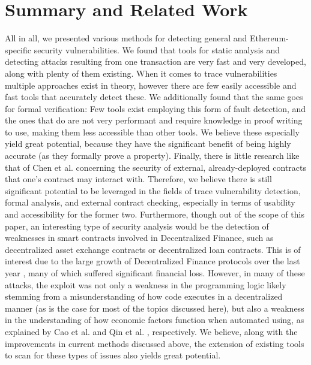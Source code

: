 \documentclass[letterpaper,twocolumn,10pt]{article}
\begin{document}
\section{Summary and Related Work}
All in all, we presented various methods for detecting general and Ethereum-specific security vulnerabilities.  We found that tools for static analysis and detecting attacks resulting from one transaction are very fast and very developed, along with plenty of them existing. When it comes to trace vulnerabilities multiple approaches exist in theory, however there are few easily accessible and fast tools that accurately detect these. We additionally found that the same goes for formal verification: Few tools exist employing this form of fault detection, and the ones that do are not very performant and require knowledge in proof writing to use, making them less accessible than other tools. We believe these especially yield great potential, because they have the significant benefit of being highly accurate (as they formally prove a property). Finally, there is little research like that of Chen et al. \cite{chen_zhu_li_chen_li_luo_lin_zhange_2018} concerning the security of external, already-deployed contracts that one's contract may interact with. Therefore, we believe there is still significant potential to be leveraged in the fields of trace vulnerability detection, formal analysis, and external contract checking, especially in terms of usability and accessibility for the former two. Furthermore, though out of the scope of this paper, an interesting type of security analysis would be the detection of weaknesses in smart contracts involved in Decentralized Finance, such as decentralized asset exchange contracts or decentralized loan contracts. This is of interest due to the large growth of Decentralized Finance protocols over the last year \cite{flash1}, many of which suffered significant financial loss. However, in many of these attacks, the exploit was not only a weakness in the programming logic likely stemming from a misunderstanding of how code executes in a decentralized manner (as is the case for most of the topics discussed here), but also a weakness in the understanding of how economic factors function when automated using, as explained by Cao et al. \cite{flash1} and Qin et al. \cite{flash2}, respectively. We believe, along with the improvements in current methods discussed above, the extension of existing tools to scan for these types of issues also yields great potential.



\end{document}
